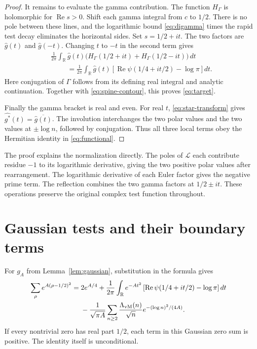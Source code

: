\documentclass[11pt]{article}
\numberwithin{equation}{section}
\newcommand{\R}{\mathbb R}
\begin{document}
\begin{proof}
It remains to evaluate the gamma contribution.
The function $H_\Gamma$ is holomorphic for $\operatorname{Re}s>0$.
Shift each gamma integral from $c$ to $1/2$.
There is no pole between these lines, and the logarithmic bound
\eqref{eq:digamma} times the rapid test decay eliminates the horizontal sides.
Set $s=1/2+it$.  The two factors are $\widehat g(t)$ and $\widehat g(-t)$.
Changing $t$ to $-t$ in the second term gives
\begin{align*}
 &\frac1{2\pi}\int_{\R}\widehat g(t)
         \bigl(H_\Gamma(1/2+it)+H_\Gamma(1/2-it)\bigr)\,dt\\
 &\hspace{1cm}=\frac1{2\pi}\int_{\R}\widehat g(t)
     \left[\operatorname{Re}\psi(1/4+it/2)-\log\pi\right]dt.
\end{align*}
Here conjugation of $\Gamma$ follows from its defining real integral and
analytic continuation.  Together with \eqref{eq:spine-contour}, this proves
\eqref{eq:target}.

Finally the gamma bracket is real and even.
For real $t$, \eqref{eq:star-transform} gives
$\widehat{g^*}(t)=\overline{\widehat g(t)}$.
The involution interchanges the two polar values and the two values at
$\pm\log n$, followed by conjugation.
Thus all three local terms obey the Hermitian identity in
\eqref{eq:functional}.
\end{proof}

The proof explains the normalization directly.
The poles of $\mathcal L$ each contribute residue $-1$ to its logarithmic
derivative, giving the two positive polar values after rearrangement.
The logarithmic derivative of each Euler factor gives the negative prime
term.  The reflection combines the two gamma factors at $1/2\pm it$.
These operations preserve the original complex test function throughout.

\section{Gaussian tests and their boundary terms}
\label{sec:polynomial-gaussians}

For $g_A$ from Lemma~\ref{lem:gaussian}, substitution in the formula gives
\begin{equation}
\begin{split}
 \sum_\rho e^{A(\rho-1/2)^2}
 ={}&2e^{A/4}
   +\frac1{2\pi}\int_{\R}e^{-At^2}
      \left[\operatorname{Re}\psi(1/4+it/2)-\log\pi\right]dt\\
 &-\frac1{\sqrt{\pi A}}\sum_{n\geq2}
       \frac{\Lambda_{\rm vM}(n)}{\sqrt n}
                       e^{-(\log n)^2/(4A)}.
\end{split}
\label{eq:gaussian-explicit}
\end{equation}
If every nontrivial zero has real part $1/2$, each term in this Gaussian
zero sum is positive.  The identity itself is unconditional.
\end{document}
